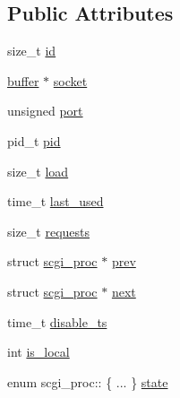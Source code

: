 \subsection*{Public Attributes}
\begin{DoxyCompactItemize}
\item 
size\-\_\-t \hyperlink{structscgi__proc_af7e907a950ab620af3a5b06727adf575}{id}
\item 
\hyperlink{structbuffer}{buffer} $\ast$ \hyperlink{structscgi__proc_ab75f773ba805b864842cc38e6413c9a5}{socket}
\item 
unsigned \hyperlink{structscgi__proc_a01546bbb3cf9a34a11cd28f9db430561}{port}
\item 
pid\-\_\-t \hyperlink{structscgi__proc_a95b096cdf28e86fd91b41043c70997c8}{pid}
\item 
size\-\_\-t \hyperlink{structscgi__proc_a013e0b6ff195b7e6cb1f97c9ffb296fe}{load}
\item 
time\-\_\-t \hyperlink{structscgi__proc_a668a2d7ba5885239e7a53f154ff6d3af}{last\-\_\-used}
\item 
size\-\_\-t \hyperlink{structscgi__proc_a44f6cb8237c073b1394bfb3999ae9a81}{requests}
\item 
struct \hyperlink{structscgi__proc}{scgi\-\_\-proc} $\ast$ \hyperlink{structscgi__proc_aa92d0093242bd955f454bff80f30e368}{prev}
\item 
struct \hyperlink{structscgi__proc}{scgi\-\_\-proc} $\ast$ \hyperlink{structscgi__proc_aa97160627b2702e3c5249d5fe2083893}{next}
\item 
time\-\_\-t \hyperlink{structscgi__proc_a18fdad63d74fd0490a64e494a7273286}{disable\-\_\-ts}
\item 
int \hyperlink{structscgi__proc_a0bcb2715d253cb39b0ee95a94dd91fa9}{is\-\_\-local}
\item 
enum scgi\-\_\-proc\-:: \{ ... \}  \hyperlink{structscgi__proc_a49e46b6044c5a88b1f7f2503834379ce}{state}
\end{DoxyCompactItemize}


